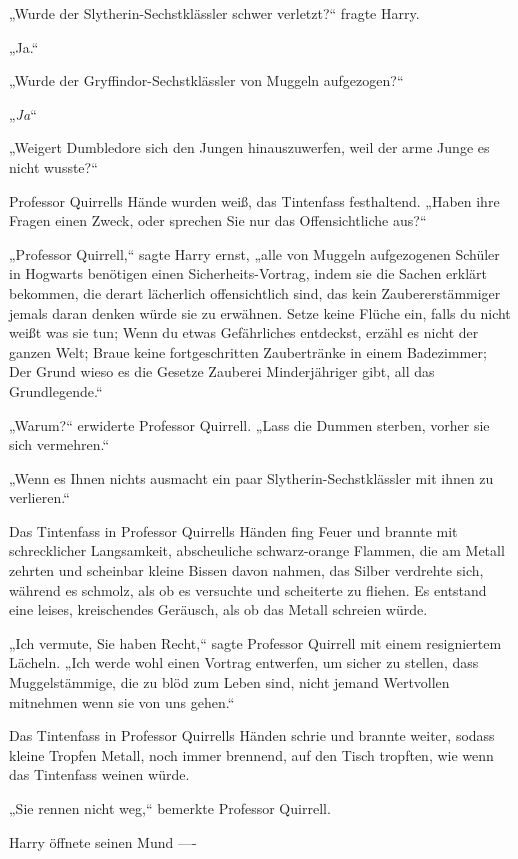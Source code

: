 {„Wurde der Slytherin-Sechstklässler schwer verletzt?“ fragte Harry.

„Ja.“

„Wurde der Gryffindor-Sechstklässler von Muggeln aufgezogen?“

„\emph{Ja}“

„Weigert Dumbledore sich den Jungen hinauszuwerfen, weil der arme Junge es nicht wusste?“

Professor Quirrells Hände wurden weiß, das Tintenfass festhaltend. „Haben ihre Fragen einen Zweck, oder sprechen Sie nur das Offensichtliche aus?“

„Professor Quirrell,“ sagte Harry ernst, „alle von Muggeln aufgezogenen Schüler in Hogwarts benötigen einen Sicherheits-Vortrag, indem sie die Sachen erklärt bekommen, die derart lächerlich offensichtlich sind, das kein Zaubererstämmiger jemals daran denken würde sie zu erwähnen. Setze keine Flüche ein, falls du nicht weißt was sie tun; Wenn du etwas Gefährliches entdeckst, erzähl es nicht der ganzen Welt; Braue keine fortgeschritten Zaubertränke in einem Badezimmer; Der Grund wieso es die Gesetze Zauberei Minderjähriger gibt, all das Grundlegende.“

„Warum?“ erwiderte Professor Quirrell. „Lass die Dummen sterben, vorher sie sich vermehren.“

„Wenn es Ihnen nichts ausmacht ein paar Slytherin-Sechstklässler mit ihnen zu verlieren.“

Das Tintenfass in Professor Quirrells Händen fing Feuer und brannte mit schrecklicher Langsamkeit, abscheuliche schwarz-orange Flammen, die am Metall zehrten und scheinbar kleine Bissen davon nahmen, das Silber verdrehte sich, während es schmolz, als ob es versuchte und scheiterte zu fliehen. Es entstand eine leises, kreischendes Geräusch, als ob das Metall schreien würde.

„Ich vermute, Sie haben Recht,“ sagte Professor Quirrell mit einem resigniertem Lächeln. „Ich werde wohl einen Vortrag entwerfen, um sicher zu stellen, dass Muggelstämmige, die zu blöd zum Leben sind, nicht jemand Wertvollen mitnehmen wenn sie von uns gehen.“

Das Tintenfass in Professor Quirrells Händen schrie und brannte weiter, sodass kleine Tropfen Metall, noch immer brennend, auf den Tisch tropften, wie wenn das Tintenfass weinen würde.

„Sie rennen nicht weg,“ bemerkte Professor Quirrell.

Harry öffnete seinen Mund ----

}
